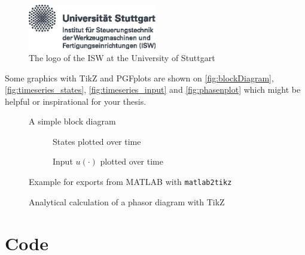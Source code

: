 \begin{figure}[htb]
\centering
\includegraphics[width=0.5\textwidth]{images/logo-isw-uni-de.eps}
\caption{The logo of the \ac{ISW} at the University of Stuttgart}
\label{fig:ustutt_logo}
\end{figure}

Some graphics with TikZ and PGFplots are shown on \autoref{fig:blockDiagram}, \autoref{fig:timeseries_states}, \autoref{fig:timeseries_input} and \autoref{fig:phasenplot} which might be helpful or inspirational for your thesis.


\begin{figure}[htbp]
    \centering
    
    \caption{A simple block diagram}
    \label{fig:blockDiagram}
\end{figure}

\begin{figure}[htbp]

\centering
\begin{subfigure}[b]{0.95\textwidth}
    
    \caption{States plotted over time}
    \label{fig:timeseries_states}
\end{subfigure}

\begin{subfigure}[b]{0.95\textwidth}
    
    \caption{Input \(u(\cdot)\) plotted over time}
    \label{fig:timeseries_input}
\end{subfigure}

\caption{Example for exports from MATLAB with \texttt{matlab2tikz}}
\label{fig:timeseries}
\end{figure}


\begin{figure}[htbp]
    \centering
    
    \caption{Analytical calculation of a phasor diagram with TikZ \cite{Tantau2013}}
    \label{fig:phasenplot}
\end{figure}

\FloatBarrier

\section{Code}

